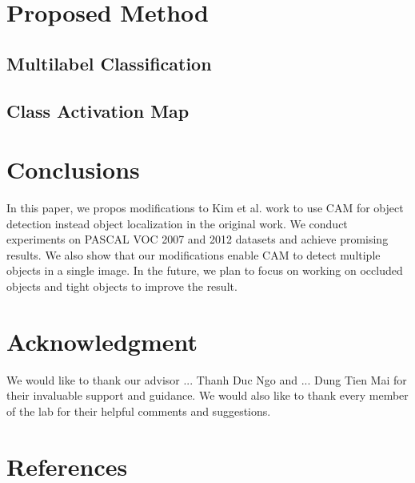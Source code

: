 \documentclass[conference]{IEEEtran}
\begin{document}
\section{Proposed Method}
\subsection{Multilabel Classification}

\subsection{Class Activation Map}

\section{Conclusions}
In this paper, we propos modifications to Kim et al. \cite {} work to use CAM for object detection instead object localization in the original work. We conduct experiments on PASCAL VOC 2007 and 2012 datasets and achieve promising results. We also show that our modifications enable CAM to detect multiple objects in a single image. In the future, we plan to focus on working on occluded objects and tight objects to improve the result.

\section*{Acknowledgment}
We would like to thank our advisor ... Thanh Duc Ngo and ... Dung Tien Mai for their invaluable support and guidance. We would also like to thank every member of the lab for their helpful comments and suggestions.

\section*{References}
\end{document}
